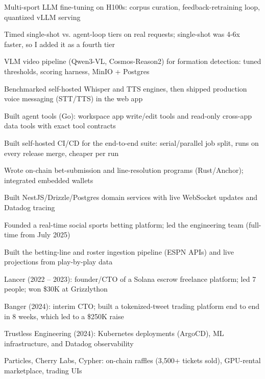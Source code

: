 \documentclass[print]{jack-resume}
\begin{document}
\begin{tightemize}
    \item Multi-sport LLM fine-tuning on H100s: corpus curation, feedback-retraining loop, quantized vLLM serving
    \item Timed single-shot vs. agent-loop tiers on real requests; single-shot was 4-6x faster, so I added it as a fourth tier
    \item VLM video pipeline (Qwen3-VL, Cosmos-Reason2) for formation detection: tuned thresholds, scoring harness, MinIO + Postgres
    \item Benchmarked self-hosted Whisper and TTS engines, then shipped production voice messaging (STT/TTS) in the web app
    \item Built agent tools (Go): workspace app write/edit tools and read-only cross-app data tools with exact tool contracts
    \item Built self-hosted CI/CD for the end-to-end suite: serial/parallel job split, runs on every release merge, cheaper per run
\end{tightemize}
\sectionsep

\begin{tightemize}
    \item Wrote on-chain bet-submission and line-resolution programs (Rust/Anchor); integrated embedded wallets
    \item Built NestJS/Drizzle/Postgres domain services with live WebSocket updates and Datadog tracing
    \item Founded a real-time social sports betting platform; led the engineering team (full-time from July 2025)
    \item Built the betting-line and roster ingestion pipeline (ESPN APIs) and live projections from play-by-play data
\end{tightemize}
\sectionsep

\begin{tightemize}
    \item Lancer (2022 – 2023): founder/CTO of a Solana escrow freelance platform; led 7 people; won \$30K at Grizzlython
    \item Banger (2024): interim CTO; built a tokenized-tweet trading platform end to end in 8 weeks, which led to a \$250K raise
    \item Trustless Engineering (2024): Kubernetes deployments (ArgoCD), ML infrastructure, and Datadog observability
    \item Particles, Cherry Labs, Cypher: on-chain raffles (3,500+ tickets sold), GPU-rental marketplace, trading UIs
\end{tightemize}
\sectionsep
\end{document}
